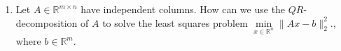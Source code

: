 \begin{enumerate}
	\item Let  $A \in \mathbb{R}^{m \times n}$ have independent columns. How can we use the $QR$-decomposition of $A$ to solve the least squares problem $
	\min\limits_{x \in \mathbb{R}^n } \| Ax - b \|_2^2.
	$, where $b \in \mathbb{R}^{m}$. 

\end{enumerate}
 